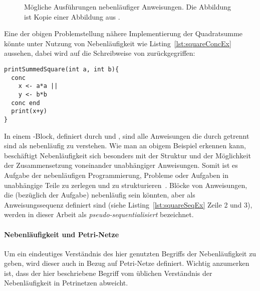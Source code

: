 \begin{figure}[hbt]
\begin{subfigure}{\textwidth}
\begin{tikzpicture}
\end{tikzpicture}
\end{subfigure}

\caption[Mögliche Ausführungen nebenläufiger Anweisungen.]{Mögliche Ausführungen nebenläufiger Anweisungen. Die Abbildung ist Kopie einer Abbildung aus \cite{Herrtwich1989}.}\label{fig:concAnweisungen}
\end{figure}

Eine der obigen Problemstellung nähere Implementierung der Quadratsumme könnte unter Nutzung von Nebenläufigkeit wie Listing~\vref{lst:squareConcEx} aussehen, dabei wird auf die Schreibweise von \textcite[S.~16]{Herrtwich1989} zurückgegriffen:
\begin{lstlisting}[caption={[Beispiel eines Programms mit nebenläufigem Code in einem \code{conc}-Block.]Beispiel eines Programms mit nebenläufigem Code in einem \code{conc}-Block. Das Programm gibt die Summe von zwei Quadratzahlen aus, wobei die Berechnung der Quadratzahlen nebenläufig stattfindet.}, label={lst:squareConcEx}]
printSummedSquare(int a, int b){
  conc 
    x <- a*a ||
    y <- b*b
  conc end
  print(x+y)
}
\end{lstlisting}
In einem -Block, definiert durch  und , sind alle Anweisungen die durch \code{||} getrennt sind als nebenläufig zu verstehen. Wie man an obigem Beispiel erkennen kann, beschäftigt Nebenläufigkeit sich besonders mit der Struktur und der Möglichkeit der Zusammensetzung voneinander unabhängiger Anweisungen. Somit ist es Aufgabe der nebenläufigen Programmierung, Probleme oder Aufgaben in unabhängige Teile zu zerlegen und zu strukturieren~\cite{Pike2012,Hettel2016}. Blöcke von Anweisungen, die (bezüglich der Aufgabe) nebenläufig sein könnten, aber als Anweisungssequenz definiert sind (siehe Listing~\vref{lst:squareSeqEx} Zeile 2 und 3), werden in dieser Arbeit als \emph{pseudo-sequentialisiert} bezeichnet.

\paragraph{Nebenläufigkeit und Petri-Netze}
Um ein eindeutiges Verständnis des hier genutzten Begriffs der Nebenläufigkeit zu geben, wird dieser auch in Bezug auf Petri-Netze definiert. Wichtig anzumerken ist, dass der hier beschriebene Begriff vom üblichen Verständnis der Nebenläufigkeit in Petrinetzen abweicht. 

